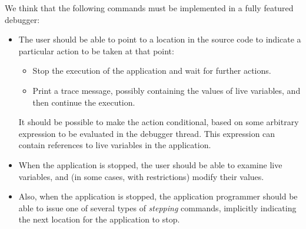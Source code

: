 We think that the following commands must be implemented in a fully
featured debugger:

\begin{itemize}
\item The user should be able to point to a location
  in the source code to indicate a particular action to be taken at
  that point:
  \begin{itemize}
  \item Stop the execution of the application and wait for further
    actions.
  \item Print a trace message, possibly containing the values of live
    variables, and then continue the execution. 
  \end{itemize}
  It should be possible to make the action conditional, based on some
  arbitrary expression to be evaluated in the debugger thread.  This
  expression can contain references to live variables in the
  application.
\item When the application is stopped, the user
  should be able to examine live variables, and (in some cases, with
  restrictions) modify their values.
\item Also, when the application is stopped, the application
  programmer should be able to issue one of several types of
  \emph{stepping} commands, implicitly indicating the next location
  for the application to stop.
\end{itemize}
